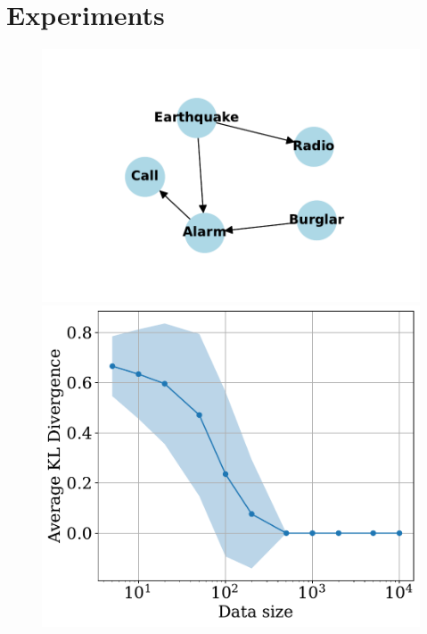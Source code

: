 \section{Experiments}
\begin{figure}
    \centering
    \begin{minipage}{\textwidth}
    \includegraphics[width = \linewidth]{plots/alarm.pdf}
    \end{minipage}
    \begin{minipage}{0.32\textwidth}
    \includegraphics[width = \linewidth]{plots/kl_divergence.pdf}
    \end{minipage}
    \begin{minipage}{0.32\textwidth}

\end{minipage}
\end{figure}
